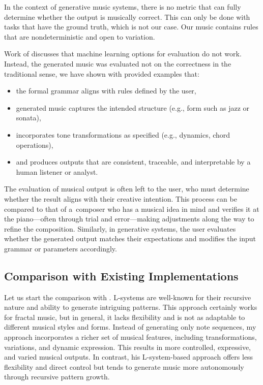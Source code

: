In the context of generative music systems, there is no metric that can fully determine whether the output is musically correct. This can only be done with tasks that have the ground truth, which is not our case. Our music contains rules that are nondeterministic and open to variation.

Work of \cite{eibensteiner2018procedural} discusses that machine learning options for evaluation do not work. Instead, the generated music was evaluated not on the correctness in the traditional sense, we have shown with provided examples that:

\begin{itemize}
    \item the formal grammar aligns with rules defined by the user,
    \item generated music captures the intended structure (e.g., form such as jazz or sonata),
    \item incorporates tone transformations as specified (e.g., dynamics, chord operations),
    \item and produces outputs that are consistent, traceable, and interpretable by a human listener or analyst.
\end{itemize}

The evaluation of musical output is often left to the user, who must determine whether the result aligns with their creative intention. This process can be compared to that of a~composer who has a musical idea in mind and verifies it at the piano—often through trial and error—making adjustments along the way to refine the composition. Similarly, in generative systems, the user evaluates whether the generated output matches their expectations and modifies the input grammar or parameters accordingly.

\subsection*{Comparison with Existing Implementations}
Let us start the comparison with \cite{bachelorthesis}. L-systems are well-known for their recursive nature and ability to generate intriguing patterns. This approach certainly works for fractal music, but in general, it lacks flexibility and is not as adaptable to different musical styles and forms. Instead of generating only note sequences, my approach incorporates a richer set of musical features, including transformations, variations, and dynamic expression. This results in more controlled, expressive, and varied musical outputs. In contrast, his L-system-based approach offers less flexibility and direct control but tends to generate music more autonomously through recursive pattern growth.

